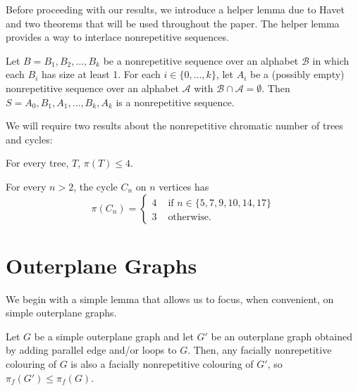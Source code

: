 \documentclass{patmorin}
\begin{document}
Before proceeding with our results, we introduce a helper lemma
due to Havet \etal~\cite{havet2011facial} and two theorems that
will be used throughout the paper. The helper lemma provides a way to
interlace nonrepetitive sequences.

\begin{lem}
  Let $B=B_1,B_2,\ldots,B_k$ be a nonrepetitive sequence over an alphabet
  $\mathcal{B}$ in which each $B_i$ has size at least 1. For each $i
  \in \{0,\ldots,k\}$, let $A_i$ be a (possibly empty) nonrepetitive
  sequence over an alphabet $\mathcal{A}$ with $\mathcal{B} \cap
  \mathcal{A} = \emptyset$. Then $S = A_0, B_1, A_1, \ldots, B_k, A_k$
  is a nonrepetitive sequence.
\end{lem}

We will require two results about the nonrepetitive chromatic number of
trees and cycles:

\begin{thm}
  For every tree, $T$, $\pi(T) \leq 4$.
\end{thm}

\begin{thm}
  For every $n>2$, the cycle $C_n$ on $n$ vertices has
  \[
  \pi(C_n) = \begin{cases}
              4 & \text{ if } n \in \{5,7,9,10,14,17\} \\
              3 & \text{ otherwise. }
             \end{cases}
  \]
\end{thm}

\section{Outerplane Graphs}

We begin with a simple lemma that allows us to focus, when convenient,
on simple outerplane graphs.

\begin{lem}
  Let $G$ be a simple outerplane graph and let $G'$ be an outerplane
  graph obtained by adding parallel edge and/or loops to $G$.  Then, any
  facially nonrepetitive colouring of $G$ is also a facially nonrepetitive
  colouring of $G'$, so $\pi_f(G')\le \pi_f(G)$.
\end{lem}
\end{document}
